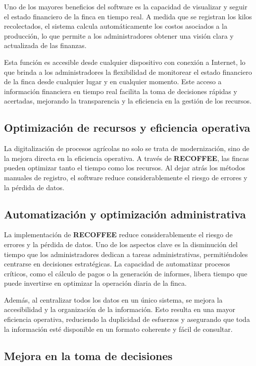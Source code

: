 \documentclass[a4paper,12pt]{article}
\begin{document}
Uno de los mayores beneficios del software es la capacidad de visualizar y seguir el estado financiero de la finca en tiempo real. A medida que se registran los kilos recolectados, el sistema calcula automáticamente los costos asociados a la producción, lo que permite a los administradores obtener una visión clara y actualizada de las finanzas.

Esta función es accesible desde cualquier dispositivo con conexión a Internet, lo que brinda a los administradores la flexibilidad de monitorear el estado financiero de la finca desde cualquier lugar y en cualquier momento. Este acceso a información financiera en tiempo real facilita la toma de decisiones rápidas y acertadas, mejorando la transparencia y la eficiencia en la gestión de los recursos.

\subsection*{Optimización de recursos y eficiencia operativa}

La digitalización de procesos agrícolas no solo se trata de modernización, sino de la mejora directa en la eficiencia operativa. A través de \textbf{RECOFFEE}, las fincas pueden optimizar tanto el tiempo como los recursos. Al dejar atrás los métodos manuales de registro, el software reduce considerablemente el riesgo de errores y la pérdida de datos.

\subsection*{Automatización y optimización administrativa}

La implementación de \textbf{RECOFFEE} reduce considerablemente el riesgo de errores y la pérdida de datos. Uno de los aspectos clave es la disminución del tiempo que los administradores dedican a tareas administrativas, permitiéndoles centrarse en decisiones estratégicas. La capacidad de automatizar procesos críticos, como el cálculo de pagos o la generación de informes, libera tiempo que puede invertirse en optimizar la operación diaria de la finca.

Además, al centralizar todos los datos en un único sistema, se mejora la accesibilidad y la organización de la información. Esto resulta en una mayor eficiencia operativa, reduciendo la duplicidad de esfuerzos y asegurando que toda la información esté disponible en un formato coherente y fácil de consultar.

\subsection*{Mejora en la toma de decisiones}
\end{document}
